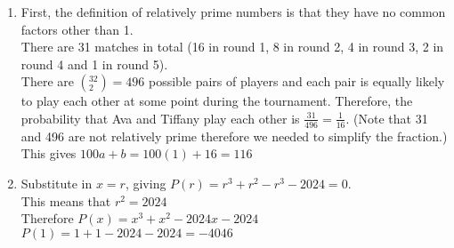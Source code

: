 \documentclass[../main.tex]{subfiles}
\begin{document}
\begin{enumerate}
    \item 
    First, the definition of relatively prime numbers is that they have no common factors other than 1.\\
    
    There are 31 matches in total (16 in round 1, 8 in round 2, 4 in round 3, 2 in round 4 and 1 in round 5).\\

    There are \((^{32}_2)=496\) possible pairs of players and each pair is equally likely to play each other at some point during the tournament. Therefore, the probability that Ava and Tiffany play each other is \(\frac{31}{496}=\frac{1}{16}\). (Note that 31 and 496 are not relatively prime therefore we needed to simplify the fraction.)\\

    This gives \(100a+b=100(1)+16=116\)\\

    \item 
    Substitute in \(x=r\), giving \(P(r)=r^3+r^2-r^3-2024=0\).\\

    This means that \(r^2=2024\)\\

    Therefore \(P(x)=x^3+x^2-2024x-2024\)\\

    \(P(1)=1+1-2024-2024=-4046\)
   
\end{enumerate}
\end{document}
